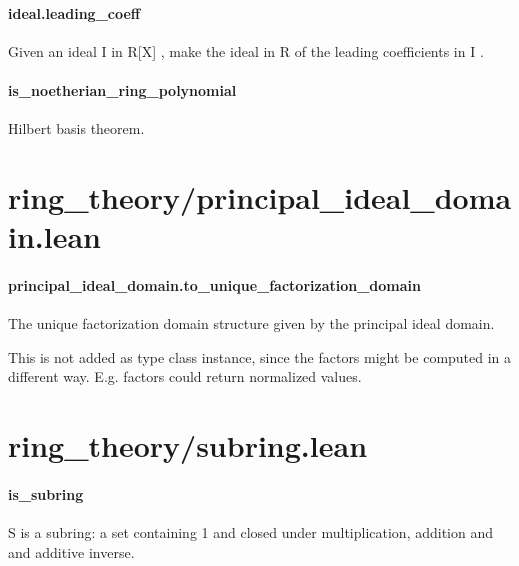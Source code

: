 \documentclass{article}
\begin{document}
\paragraph{ideal.leading\_coeff}
\par
Given an ideal 
\colorbox[RGB]{253,246,227}{{{{\color[RGB]{101, 123, 131} I }}}} in 
\colorbox[RGB]{253,246,227}{{{{\color[RGB]{101, 123, 131} R{[}X{]} }}}}, make the ideal in 
\colorbox[RGB]{253,246,227}{{{{\color[RGB]{101, 123, 131} R }}}} of the
leading coefficients in 
\colorbox[RGB]{253,246,227}{{{{\color[RGB]{101, 123, 131} I }}}}.
\paragraph{is\_noetherian\_ring\_polynomial}
\par
Hilbert basis theorem.
\section{ring\_theory/principal\_ideal\_domain.lean}\paragraph{principal\_ideal\_domain.to\_unique\_factorization\_domain}
\par
The unique factorization domain structure given by the principal ideal domain.
\par
This is not added as type class instance, since the 
\colorbox[RGB]{253,246,227}{{{{\color[RGB]{101, 123, 131} factors }}}} might be computed in a different way.
E.g. factors could return normalized values.
\section{ring\_theory/subring.lean}\paragraph{is\_subring}
\par
\colorbox[RGB]{253,246,227}{{{{\color[RGB]{101, 123, 131} S }}}} is a subring: a set containing 1 and closed under multiplication, addition and and additive inverse.
\end{document}
